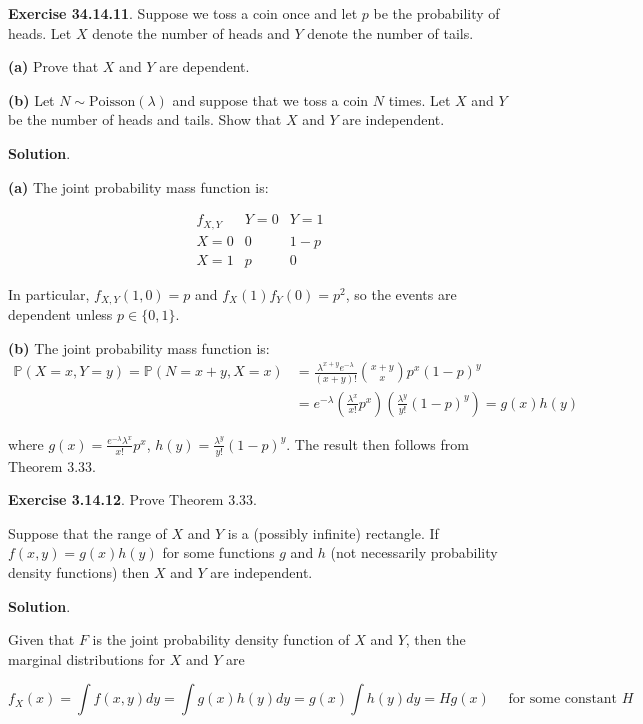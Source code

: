 \textbf{Exercise 34.14.11}. Suppose we toss a coin once and let \(p\) be
the probability of heads. Let \(X\) denote the number of heads and \(Y\)
denote the number of tails.

\textbf{(a)} Prove that \(X\) and \(Y\) are dependent.

\textbf{(b)} Let \(N \sim \text{Poisson}(\lambda)\) and suppose that we
toss a coin \(N\) times. Let \(X\) and \(Y\) be the number of heads and
tails. Show that \(X\) and \(Y\) are independent.

\textbf{Solution}.

\textbf{(a)} The joint probability mass function is:

\[
\begin{array}{c|cc}
f_{X, Y} & Y = 0 & Y = 1 \\
\hline
X = 0 & 0 & 1 - p\\
X = 1 & p & 0
\end{array}
\]

In particular, \(f_{X, Y}(1, 0) = p\) and \(f_X(1) f_Y(0) = p^{2}\), so
the events are dependent unless \(p \in \{0, 1\}\).

\textbf{(b)} The joint probability mass function is:
\begin{align*}
\mathbb{P}(X = x, Y = y) 
  = \mathbb{P}(N = x + y, X = x) 
& = \frac{\lambda^{x+y}e^{-\lambda}}{(x + y)!} \binom{x + y}{x} p^x (1-p)^y 
\\[1ex]
& = e^{-\lambda} \left(\frac{\lambda^x}{x!} p^x \right) \left(\frac{\lambda^y}{y!} (1 - p)^y\right) 
  = g(x) h(y)
\end{align*}

where \(g(x) =  \frac{e^{-\lambda}\lambda^x}{x!} p^{x}\), 
\(h(y) = \frac{\lambda^y}{y!} (1 - p)^{y} \). 
The result then follows from Theorem 3.33.

\textbf{Exercise 3.14.12}. Prove Theorem 3.33.

Suppose that the range of \(X\) and \(Y\) is a (possibly infinite)
rectangle. If \(f(x, y) = g(x) h(y)\) for some functions \(g\) and \(h\)
(not necessarily probability density functions) then \(X\) and \(Y\) are
independent.

\textbf{Solution}.

Given that \(F\) is the joint probability density function of \(X\) and
\(Y\), then the marginal distributions for \(X\) and \(Y\) are

\[ f_X(x) = \int f(x, y) dy = \int g(x) h(y) dy = g(x) \int h(y) dy = H g(x) \quad \text{ for some constant } H \]

